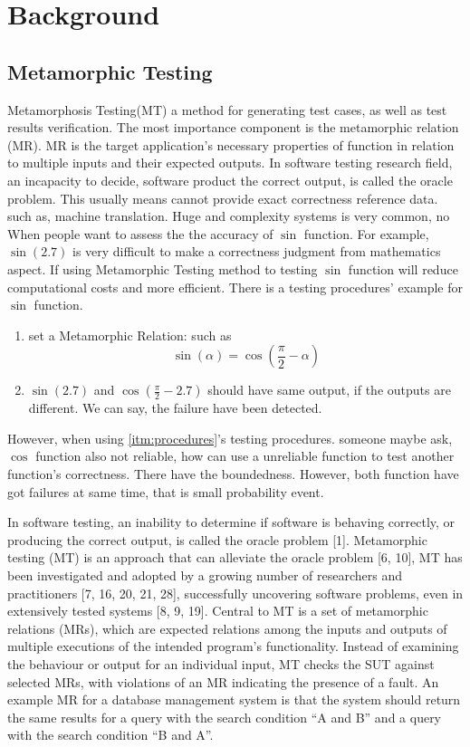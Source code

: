 \documentclass[conference]{IEEEtran}
\begin{document}
\section{Background}
\subsection{Metamorphic Testing}
Metamorphosis Testing(MT) a method for generating test cases, as well as test
results verification. The most importance component is the metamorphic
relation (MR). MR is the target application's necessary properties of function in relation to multiple
inputs and their expected outputs.
In software testing research field, an incapacity to decide, software product
the correct output, is called the oracle problem. This usually means cannot
provide exact correctness reference data. such as, machine translation. Huge and
complexity systems is very common, no
When people want to assess the the accuracy of $\sin$ function. For example, $\sin(2.7)$ is very difficult to
make a correctness judgment from mathematics aspect. If using Metamorphic
Testing method to testing $\sin$ function will reduce computational costs and
more efficient. There is a testing procedures' example for $\sin$ function.
\begin{enumerate}\label{itm:procedures}
\item set a Metamorphic Relation: such as $$\sin(\alpha) = \cos(\frac{\pi}{2} - \alpha)$$
\item $\sin(2.7)$ and $\cos(\frac{\pi}{2} - 2.7)$ should have same output, if the
  outputs are different. We can say, the failure have been detected.
\end{enumerate}
However, when using \ref{itm:procedures}'s testing procedures. someone maybe
ask, $\cos$ function also not reliable, how can use a unreliable function to
test another function's correctness. There have the boundedness. However, both
function have got failures at same time, that is small probability event.

In software testing, an inability to determine if software is behaving
correctly, or producing the correct output, is called the oracle problem [1]. Metamorphic testing (MT) is an approach that can alleviate
the oracle problem [6, 10], MT has been investigated and adopted by
a growing number of researchers and practitioners [7, 16, 20, 21, 28],
successfully uncovering software problems, even in extensively
tested systems [8, 9, 19]. Central to MT is a set of metamorphic
relations (MRs), which are expected relations among the inputs and
outputs of multiple executions of the intended program’s functionality. Instead of examining the behaviour or output for an individual
input, MT checks the SUT against selected MRs, with violations of
an MR indicating the presence of a fault.
An example MR for a database management system is that the
system should return the same results for a query with the search
condition “A and B” and a query with the search condition “B and
A”.
\end{document}
